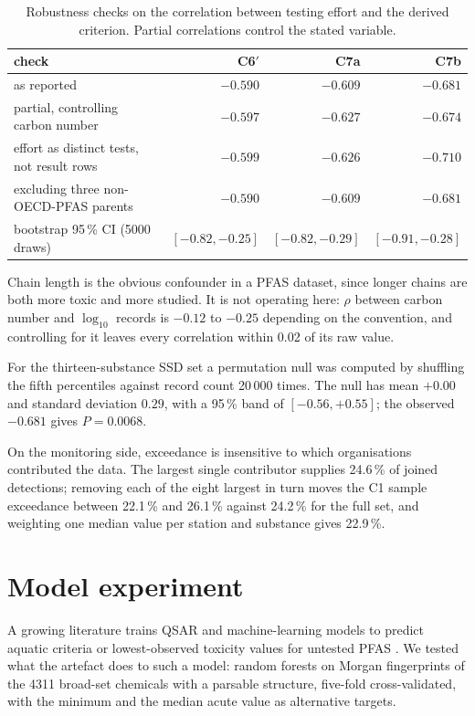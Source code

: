 \documentclass[preprint,11pt]{elsarticle}
\begin{document}
\begin{table}[htbp]
\centering\footnotesize
\caption{Robustness checks on the correlation between testing effort and the
derived criterion. Partial correlations control the stated variable.}
\label{tab:rob}
\begin{tabular}{@{}l rrr@{}}
\toprule
check & C6$'$ & C7a & C7b\\
\midrule
as reported & $-0.590$ & $-0.609$ & $-0.681$\\
partial, controlling carbon number & $-0.597$ & $-0.627$ & $-0.674$\\
effort as distinct tests, not result rows & $-0.599$ & $-0.626$ & $-0.710$\\
excluding three non-OECD-PFAS parents & $-0.590$ & $-0.609$ & $-0.681$\\
bootstrap 95\,\% CI (5000 draws) & $[-0.82,-0.25]$ & $[-0.82,-0.29]$ & $[-0.91,-0.28]$\\
\bottomrule
\end{tabular}
\end{table}

Chain length is the obvious confounder in a PFAS dataset, since longer chains
are both more toxic and more studied. It is not operating here: $\rho$ between
carbon number and $\log_{10}$ records is $-0.12$ to $-0.25$ depending on the
convention, and controlling for it leaves every correlation within 0.02 of its
raw value.

For the thirteen-substance SSD set a permutation null was computed by shuffling
the fifth percentiles against record count 20\,000 times. The null has mean
$+0.00$ and standard deviation $0.29$, with a 95\,\% band of $[-0.56, +0.55]$;
the observed $-0.681$ gives $P = 0.0068$.

On the monitoring side, exceedance is insensitive to which organisations
contributed the data. The largest single contributor supplies 24.6\,\% of joined
detections; removing each of the eight largest in turn moves the C1 sample
exceedance between 22.1\,\% and 26.1\,\% against 24.2\,\% for the full set, and
weighting one median value per station and substance gives 22.9\,\%.

\clearpage
\section{Model experiment}


A growing literature trains QSAR and machine-learning models to predict aquatic
criteria or lowest-observed toxicity values for untested PFAS
\cite{khan2019ecotoxqsar, sarkar2026pfasqsar, liang2025datagaps}. We tested what
the artefact does to such a model: random forests on Morgan fingerprints of the
4311 broad-set chemicals with a parsable structure, five-fold cross-validated,
with the minimum and the median acute value as alternative targets.
\end{document}
